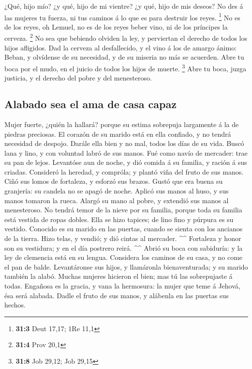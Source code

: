  ¿Qué, hijo mío? ¿y qué, hijo de mi vientre? ¿y qué, hijo de
mis deseos?  No des á las mujeres tu fuerza, ni tus caminos
á lo que es para destruir los reyes. \footnote{\textbf{31:3} Deut 17,17;
  1Re 11,1}  No es de los reyes, oh Lemuel, no es de los
reyes beber vino, ni de los príncipes la cerveza. \footnote{\textbf{31:4}
  Prov 20,1}  No sea que bebiendo olviden la ley, y
perviertan el derecho de todos los hijos afligidos.  Dad la
cerveza al desfallecido, y el vino á los de amargo ánimo: 
Beban, y olvídense de su necesidad, y de su miseria no más se acuerden.
 Abre tu boca por el mudo, en el juicio de todos los hijos
de muerte. \footnote{\textbf{31:8} Job 29,12; Job 29,15} 
Abre tu boca, juzga justicia, y el derecho del pobre y del menesteroso.

\hypertarget{alabado-sea-el-ama-de-casa-capaz}{%
\subsection{Alabado sea el ama de casa
capaz}\label{alabado-sea-el-ama-de-casa-capaz}}

 Mujer fuerte, ¿quién la hallará? porque su estima
sobrepuja largamente á la de piedras preciosas.  El corazón
de su marido está en ella confiado, y no tendrá necesidad de despojo.
 Darále ella bien y no mal, todos los días de su vida.
 Buscó lana y lino, y con voluntad labró de sus manos.
 Fué como navío de mercader: trae su pan de lejos.
 Levantóse aun de noche, y dió comida á su familia, y
ración á sus criadas.  Consideró la heredad, y compróla; y
plantó viña del fruto de sus manos.  Ciñó sus lomos de
fortaleza, y esforzó sus brazos.  Gustó que era buena su
granjería: su candela no se apagó de noche.  Aplicó sus
manos al huso, y sus manos tomaron la rueca.  Alargó su
mano al pobre, y extendió sus manos al menesteroso.  No
tendrá temor de la nieve por su familia, porque toda su familia está
vestida de ropas dobles.  Ella se hizo tapices; de lino
fino y púrpura es su vestido.  Conocido es su marido en las
puertas, cuando se sienta con los ancianos de la tierra. 
Hizo telas, y vendió; y dió cintas al mercader. \^{}\^{} 
Fortaleza y honor son su vestidura; y en el día postrero reirá. \^{}\^{}
 Abrió su boca con sabiduría: y la ley de clemencia está en
su lengua.  Considera los caminos de su casa, y no come el
pan de balde.  Levantáronse sus hijos, y llamáronla
bienaventurada; y su marido también la alabó.  Muchas
mujeres hicieron el bien; mas tú las sobrepujaste á todas. 
Engañosa es la gracia, y vana la hermosura: la mujer que teme á Jehová,
ésa será alabada.  Dadle el fruto de sus manos, y alábenla
en las puertas sus hechos.
